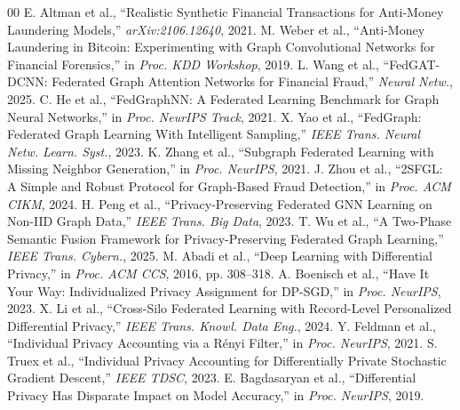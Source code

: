 \documentclass[conference]{IEEEtran}
\begin{document}
\begin{thebibliography}{00}
 E. Altman et al., ``Realistic Synthetic Financial Transactions for Anti-Money Laundering Models,'' \emph{arXiv:2106.12640}, 2021.
 M. Weber et al., ``Anti-Money Laundering in Bitcoin: Experimenting with Graph Convolutional Networks for Financial Forensics,'' in \emph{Proc. KDD Workshop}, 2019.
 L. Wang et al., ``FedGAT-DCNN: Federated Graph Attention Networks for Financial Fraud,'' \emph{Neural Netw.}, 2025.
 C. He et al., ``FedGraphNN: A Federated Learning Benchmark for Graph Neural Networks,'' in \emph{Proc. NeurIPS Track}, 2021.
 X. Yao et al., ``FedGraph: Federated Graph Learning With Intelligent Sampling,'' \emph{IEEE Trans. Neural Netw. Learn. Syst.}, 2023.
 K. Zhang et al., ``Subgraph Federated Learning with Missing Neighbor Generation,'' in \emph{Proc. NeurIPS}, 2021.
 J. Zhou et al., ``2SFGL: A Simple and Robust Protocol for Graph-Based Fraud Detection,'' in \emph{Proc. ACM CIKM}, 2024.
 H. Peng et al., ``Privacy-Preserving Federated GNN Learning on Non-IID Graph Data,'' \emph{IEEE Trans. Big Data}, 2023.
 T. Wu et al., ``A Two-Phase Semantic Fusion Framework for Privacy-Preserving Federated Graph Learning,'' \emph{IEEE Trans. Cybern.}, 2025.
 M. Abadi et al., ``Deep Learning with Differential Privacy,'' in \emph{Proc. ACM CCS}, 2016, pp. 308--318.
 A. Boenisch et al., ``Have It Your Way: Individualized Privacy Assignment for DP-SGD,'' in \emph{Proc. NeurIPS}, 2023.
 X. Li et al., ``Cross-Silo Federated Learning with Record-Level Personalized Differential Privacy,'' \emph{IEEE Trans. Knowl. Data Eng.}, 2024.
 Y. Feldman et al., ``Individual Privacy Accounting via a R\'enyi Filter,'' in \emph{Proc. NeurIPS}, 2021.
 S. Truex et al., ``Individual Privacy Accounting for Differentially Private Stochastic Gradient Descent,'' \emph{IEEE TDSC}, 2023.
 E. Bagdasaryan et al., ``Differential Privacy Has Disparate Impact on Model Accuracy,'' in \emph{Proc. NeurIPS}, 2019.
\end{thebibliography}
\end{document}
